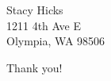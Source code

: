 \documentclass{letter}
\newcommand{\company}{Pierce County Medical Reserve Corps}
\begin{document}
\begin{letter}{Stacy Hicks\\
1211 4th Ave E\\
Olympia, WA 98506}


\closing{Thank you!}

\end{letter}
\end{document}
